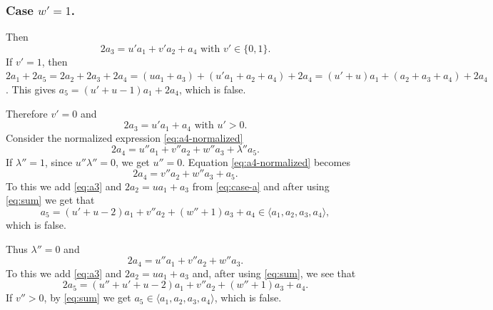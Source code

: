 \documentclass[12pt]{amsart}
\begin{document}
\subsubsection{Case \underline{$w'=1$}.}
\label{ssec-test}
Then 
\begin{equation*}
2a_3= u' a_1+ v' a_2+a_4 \text{ with } v'\in \{0,1\}.
\end{equation*}
If $v'=1$, then $2a_1+ 2a_5= 2a_2+ 2a_3+ 2 a_4= (u a_1+a_3)+ (u' a_1+ a_2+a_4)+ 2a_4= (u'+u) a_1+ (a_2+a_3+a_4)+ 2a_4$. 
This gives $a_5=(u'+u-1)a_1+2 a_4$, which is false.

\noindent Therefore $v'=0$ and
\begin{equation}
\label{eq:a3}
2a_3= u' a_1+  a_4 \text{ with } u' >0.
\end{equation} 
Consider the normalized expression \eqref{eq:a4-normalized}
\begin{equation*}
									2a_4= u'' a_1 + v'' a_2 + w'' a_3 +\lambda'' a_5.
\end{equation*} 
If $\lambda'' =1$,  since $u''\lambda''=0$, we get $u''=0$. Equation  \eqref{eq:a4-normalized} becomes
\begin{equation*}
2 a_4= v'' a_2+ w'' a_3+ a_5.
\end{equation*}
To this we add \eqref{eq:a3} and  $2a_2= u a_1+a_3$ from \eqref{eq:case-a} and after using \eqref{eq:sum} we get that
$$
 a_5= (u'+u-2) a_1 + v'' a_2+ (w''+1) a_3+ a_4 \in \langle a_1, a_2, a_3, a_4\rangle,
$$
which is false.

\noindent Thus $\lambda''=0$ and 
$$
2 a_4= u'' a_1+ v'' a_2+ w'' a_3.
$$
To this we   add \eqref{eq:a3} and $2a_2= u a_1+a_3$ and, after using \eqref{eq:sum}, we see that
$$
2 a_5=(u''+u'+u-2) a_1+  v'' a_2+ (w''+1)a_3+ a_4.
$$
If $v''>0$, by \eqref{eq:sum} we get $a_5\in \langle a_1, a_2, a_3, a_4 \rangle$, which is false.
\end{document}
